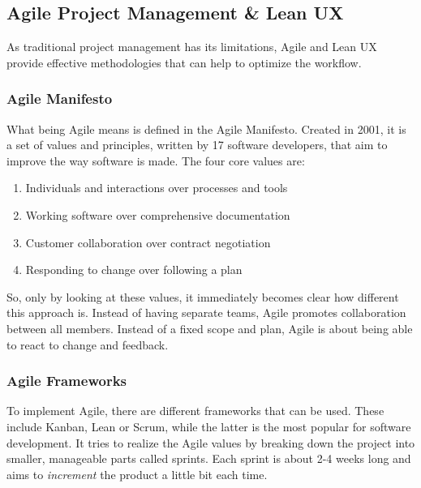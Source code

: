 \newpage
\subsection{Agile Project Management \& Lean UX} \label{Agile Project Management & Lean UX}
As traditional project management has its limitations, Agile and Lean UX provide effective
methodologies that can help to optimize the workflow.

\subsubsection{Agile Manifesto}

What being Agile means is defined in the Agile Manifesto. Created in 2001, it is a set of values and
principles, written by 17 software developers, that aim to improve the way software is made. The
four core values are:
\begin{enumerate}
    \item Individuals and interactions over processes and tools
    \item Working software over comprehensive documentation
    \item Customer collaboration over contract negotiation
    \item Responding to change over following a plan
\end{enumerate}

So, only by looking at these values, it immediately becomes clear how different this approach is.
Instead of having separate teams, Agile promotes collaboration between all members. Instead of a 
fixed scope and plan, Agile is about being able to react to change and feedback. 

\subsubsection{Agile Frameworks}
To implement Agile, there are different frameworks that can be used. These include Kanban, Lean or
Scrum, while the latter is the most popular for software development. It tries to realize the Agile
values by breaking down the project into smaller, manageable parts called sprints. Each sprint is
about 2-4 weeks long and aims to \textit{increment} the product a little bit each time.


